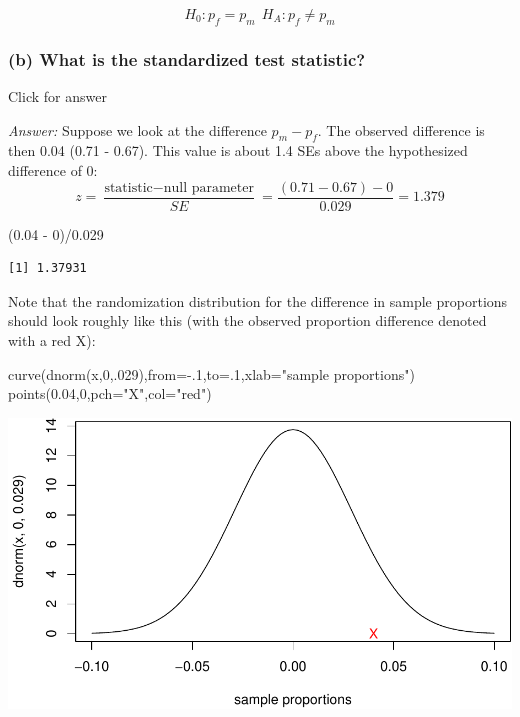 \documentclass[
]{book}
\newenvironment{Shaded}{\begin{snugshade}}{\end{snugshade}}
\newcommand{\AttributeTok}[1]{\textcolor[rgb]{0.77,0.63,0.00}{#1}}
\newcommand{\DecValTok}[1]{\textcolor[rgb]{0.00,0.00,0.81}{#1}}
\newcommand{\FloatTok}[1]{\textcolor[rgb]{0.00,0.00,0.81}{#1}}
\newcommand{\FunctionTok}[1]{\textcolor[rgb]{0.00,0.00,0.00}{#1}}
\newcommand{\NormalTok}[1]{#1}
\newcommand{\SpecialCharTok}[1]{\textcolor[rgb]{0.00,0.00,0.00}{#1}}
\newcommand{\StringTok}[1]{\textcolor[rgb]{0.31,0.60,0.02}{#1}}
\begin{document}
\[
H_0: p_f = p_m \ \ H_A: p_f \neq p_m
\]

\hypertarget{b-what-is-the-standardized-test-statistic-1}{%
\subsubsection{(b) What is the standardized test statistic?}\label{b-what-is-the-standardized-test-statistic-1}}

Click for answer

\emph{Answer:} Suppose we look at the difference \(p_m - p_f\). The observed difference is then 0.04 (0.71 - 0.67). This value is about 1.4 SEs above the hypothesized difference of 0:
\[
z = \dfrac{\textrm{statistic} - \textrm{null parameter}}{SE} = \dfrac{(0.71 - 0.67) - 0}{0.029} = 1.379
\]

\begin{Shaded}
\begin{Highlighting}[]
\NormalTok{(}\FloatTok{0.04} \SpecialCharTok{{-}} \DecValTok{0}\NormalTok{)}\SpecialCharTok{/}\FloatTok{0.029}
\end{Highlighting}
\end{Shaded}

\begin{verbatim}
[1] 1.37931
\end{verbatim}

Note that the randomization distribution for the difference in sample proportions should look roughly like this (with the observed proportion difference denoted with a red X):

\begin{Shaded}
\begin{Highlighting}[]
\FunctionTok{curve}\NormalTok{(}\FunctionTok{dnorm}\NormalTok{(x,}\DecValTok{0}\NormalTok{,.}\DecValTok{029}\NormalTok{),}\AttributeTok{from=}\SpecialCharTok{{-}}\NormalTok{.}\DecValTok{1}\NormalTok{,}\AttributeTok{to=}\NormalTok{.}\DecValTok{1}\NormalTok{,}\AttributeTok{xlab=}\StringTok{"sample proportions"}\NormalTok{)}
\FunctionTok{points}\NormalTok{(}\FloatTok{0.04}\NormalTok{,}\DecValTok{0}\NormalTok{,}\AttributeTok{pch=}\StringTok{"X"}\NormalTok{,}\AttributeTok{col=}\StringTok{"red"}\NormalTok{)}
\end{Highlighting}
\end{Shaded}

\includegraphics[width=1\linewidth]{Class_Activity_16_files/figure-latex/unnamed-chunk-6-1}
\end{document}
